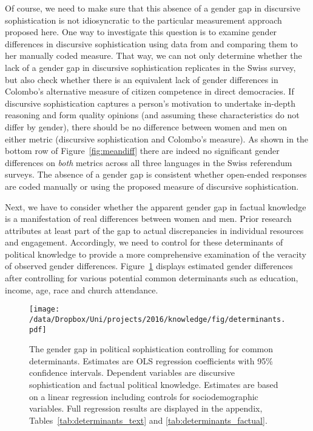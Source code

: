 Of course, we need to make sure that this absence of a gender gap in discursive sophistication is not idiosyncratic to the particular measurement approach proposed here. One way to investigate this question is to examine gender differences in discursive sophistication using data from \citet{colombo2016justifications} and comparing them to her manually coded measure. That way, we can not only determine whether the lack of a gender gap in discursive sophistication replicates in the Swiss survey, but also check whether there is an equivalent lack of gender differences in Colombo's alternative measure of citizen competence in direct democracies. If discursive sophistication captures a person's motivation to undertake in-depth reasoning and form quality opinions (and assuming these characteristics do not differ by gender), there should be no difference between women and men on either metric (discursive sophistication and Colombo's measure). As shown in the bottom row of Figure~\ref{fig:meandiff} there are indeed no significant gender differences on \textit{both} metrics across all three languages in the Swiss referendum surveys. The absence of a gender gap is consistent whether open-ended responses are coded manually or using the proposed measure of discursive sophistication.

Next, we have to consider whether the apparent gender gap in factual knowledge is a manifestation of real differences between women and men. Prior research attributes at least part of the gap to actual discrepancies in individual resources and engagement. Accordingly, we need to control for these determinants of political knowledge to provide a more comprehensive examination of the veracity of observed gender differences. Figure~\ref{fig:determinants} displays estimated gender differences after controlling for various potential common determinants such as education, income, age, race and church attendance.

\begin{figure}[h]\centering
\texttt{[image: /data/Dropbox/Uni/projects/2016/knowledge/fig/determinants.pdf]}
\caption[The gender gap in political sophistication after controlling for common determinants.]{The gender gap in political sophistication controlling for common determinants. Estimates are OLS regression coefficients with 95\% confidence intervals. Dependent variables are discursive sophistication and factual political knowledge. Estimates are based on a linear regression including controls for sociodemographic variables. Full regression results are displayed in the appendix, Tables~\ref{tab:determinants_text} and \ref{tab:determinants_factual}.}\label{fig:determinants}
\end{figure}

